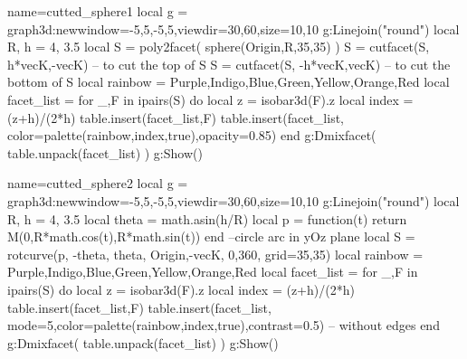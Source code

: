 \documentclass[12pt]{standalone}
\begin{document}
\begin{luadraw}{name=cutted_sphere1}
local g = graph3d:new{window={-5,5,-5,5},viewdir={30,60},size={10,10}}
g:Linejoin("round")
local R, h = 4, 3.5
local S = poly2facet( sphere(Origin,R,35,35) )
S = cutfacet(S, {h*vecK,-vecK}) -- to cut the top of S
S = cutfacet(S, {-h*vecK,vecK}) -- to cut the bottom of S
local rainbow = {Purple,Indigo,Blue,Green,Yellow,Orange,Red}
local facet_list = {}
for _,F in ipairs(S) do
    local z = isobar3d(F).z
    local index = (z+h)/(2*h)
    table.insert(facet_list,F)
    table.insert(facet_list, {color=palette(rainbow,index,true),opacity=0.85})
end
g:Dmixfacet( table.unpack(facet_list) )
g:Show()
\end{luadraw}

\begin{luadraw}{name=cutted_sphere2}
local g = graph3d:new{window={-5,5,-5,5},viewdir={30,60},size={10,10}}
g:Linejoin("round")
local R, h = 4, 3.5
local theta = math.asin(h/R)
local p = function(t) return M(0,R*math.cos(t),R*math.sin(t)) end --circle arc in yOz plane
local S = rotcurve(p, -theta, theta, {Origin,-vecK}, 0,360, {grid={35,35}})
local rainbow = {Purple,Indigo,Blue,Green,Yellow,Orange,Red}
local facet_list = {}
for _,F in ipairs(S) do
    local z = isobar3d(F).z
    local index = (z+h)/(2*h)
    table.insert(facet_list,F)
    table.insert(facet_list, {mode=5,color=palette(rainbow,index,true),contrast=0.5}) -- without edges
end
g:Dmixfacet( table.unpack(facet_list) )
g:Show()
\end{luadraw} 
\end{document}
